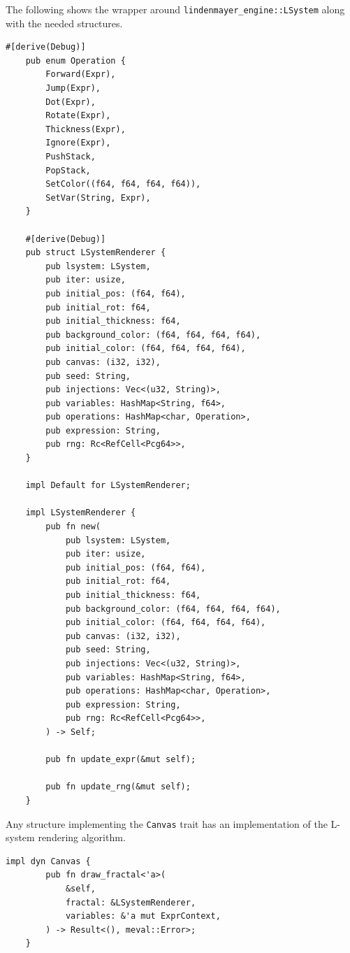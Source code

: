 \documentclass[a4paper]{article}
\begin{document}
The following shows the wrapper around \texttt{lindenmayer\_engine::LSystem}
along with the needed structures.

\begin{lstlisting}[style=Rust, style=boxed]
    #[derive(Debug)]
    pub enum Operation {
        Forward(Expr),
        Jump(Expr),
        Dot(Expr),
        Rotate(Expr),
        Thickness(Expr),
        Ignore(Expr),
        PushStack,
        PopStack,
        SetColor((f64, f64, f64, f64)),
        SetVar(String, Expr),
    }
    
    #[derive(Debug)]
    pub struct LSystemRenderer {
        pub lsystem: LSystem,
        pub iter: usize,
        pub initial_pos: (f64, f64),
        pub initial_rot: f64,
        pub initial_thickness: f64,
        pub background_color: (f64, f64, f64, f64),
        pub initial_color: (f64, f64, f64, f64),
        pub canvas: (i32, i32),
        pub seed: String,
        pub injections: Vec<(u32, String)>,
        pub variables: HashMap<String, f64>,
        pub operations: HashMap<char, Operation>,
        pub expression: String,
        pub rng: Rc<RefCell<Pcg64>>,
    }
    
    impl Default for LSystemRenderer;
    
    impl LSystemRenderer {
        pub fn new(
            pub lsystem: LSystem,
            pub iter: usize,
            pub initial_pos: (f64, f64),
            pub initial_rot: f64,
            pub initial_thickness: f64,
            pub background_color: (f64, f64, f64, f64),
            pub initial_color: (f64, f64, f64, f64),
            pub canvas: (i32, i32),
            pub seed: String,
            pub injections: Vec<(u32, String)>,
            pub variables: HashMap<String, f64>,
            pub operations: HashMap<char, Operation>,
            pub expression: String,
            pub rng: Rc<RefCell<Pcg64>>,
        ) -> Self;
    
        pub fn update_expr(&mut self);

        pub fn update_rng(&mut self);
    }
\end{lstlisting}

\pagebreak

Any structure implementing the \texttt{Canvas} \gls{trait}
has an implementation of the L-system rendering algorithm.

\begin{lstlisting}[style=Rust, style=boxed]
    impl dyn Canvas {
        pub fn draw_fractal<'a>(
            &self,
            fractal: &LSystemRenderer,
            variables: &'a mut ExprContext,
        ) -> Result<(), meval::Error>;
    } 
\end{lstlisting}
\end{document}
